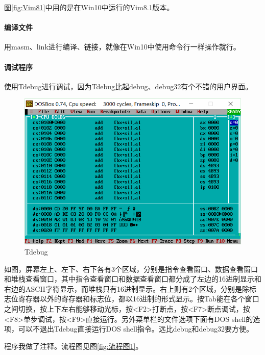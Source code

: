 \documentclass{ctexart}
\begin{document}
	图\ref{fig:Vim81}中用的是在Win10中运行的Vim8.1版本。

	\paragraph{编译文件}%
	\label{par:编译文件}

	用masm、link进行编译、链接，就像在Win10中使用命令行一样操作就行。

	\paragraph{调试程序}%
	\label{par:调试程序}

	使用Tdebug进行调试，因为Tdebug比起debug、debug32有个不错的用户界面。

	\begin{figure}[htpb]
		\centering
		\includegraphics[width=.8\linewidth]{Tdebug.png}
		\caption{Tdebug}
		\label{fig:Tdebug}
	\end{figure}

	如图，屏幕左上、左下、右下各有3个区域，分别是指令查看窗口、数据查看窗口和堆栈查看窗口，其中指令查看窗口和数据查看窗口都分成了左边的16进制显示和右边的ASCII字符显示，而堆栈只有16进制显示。右上则有2个区域，分别是除标志位寄存器以外的寄存器和标志位，都以16进制的形式显示。按Tab能在各个窗口之间切换，按上下左右能够移动光标，按<F2>打断点，按<F7>断点调试，按<F8>单步调试，按<F9>直接运行。另外菜单栏的文件选项下面有DOS shell的选项，可以不退出Tdebug直接运行DOS shell指令。远比debug和debug32要方便。


	程序我做了注释。流程图见图\ref{fig:流程图1}。
\end{document}
